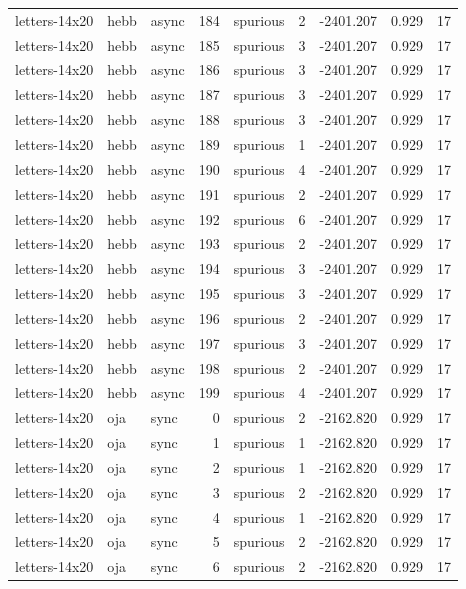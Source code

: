 \begin{tabular}{lllrlrrrr}
letters-14x20 & hebb & async & 184 & spurious & 2 & -2401.207 & 0.929 & 17 \\
letters-14x20 & hebb & async & 185 & spurious & 3 & -2401.207 & 0.929 & 17 \\
letters-14x20 & hebb & async & 186 & spurious & 3 & -2401.207 & 0.929 & 17 \\
letters-14x20 & hebb & async & 187 & spurious & 3 & -2401.207 & 0.929 & 17 \\
letters-14x20 & hebb & async & 188 & spurious & 3 & -2401.207 & 0.929 & 17 \\
letters-14x20 & hebb & async & 189 & spurious & 1 & -2401.207 & 0.929 & 17 \\
letters-14x20 & hebb & async & 190 & spurious & 4 & -2401.207 & 0.929 & 17 \\
letters-14x20 & hebb & async & 191 & spurious & 2 & -2401.207 & 0.929 & 17 \\
letters-14x20 & hebb & async & 192 & spurious & 6 & -2401.207 & 0.929 & 17 \\
letters-14x20 & hebb & async & 193 & spurious & 2 & -2401.207 & 0.929 & 17 \\
letters-14x20 & hebb & async & 194 & spurious & 3 & -2401.207 & 0.929 & 17 \\
letters-14x20 & hebb & async & 195 & spurious & 3 & -2401.207 & 0.929 & 17 \\
letters-14x20 & hebb & async & 196 & spurious & 2 & -2401.207 & 0.929 & 17 \\
letters-14x20 & hebb & async & 197 & spurious & 3 & -2401.207 & 0.929 & 17 \\
letters-14x20 & hebb & async & 198 & spurious & 2 & -2401.207 & 0.929 & 17 \\
letters-14x20 & hebb & async & 199 & spurious & 4 & -2401.207 & 0.929 & 17 \\
letters-14x20 & oja & sync & 0 & spurious & 2 & -2162.820 & 0.929 & 17 \\
letters-14x20 & oja & sync & 1 & spurious & 1 & -2162.820 & 0.929 & 17 \\
letters-14x20 & oja & sync & 2 & spurious & 1 & -2162.820 & 0.929 & 17 \\
letters-14x20 & oja & sync & 3 & spurious & 2 & -2162.820 & 0.929 & 17 \\
letters-14x20 & oja & sync & 4 & spurious & 1 & -2162.820 & 0.929 & 17 \\
letters-14x20 & oja & sync & 5 & spurious & 2 & -2162.820 & 0.929 & 17 \\
letters-14x20 & oja & sync & 6 & spurious & 2 & -2162.820 & 0.929 & 17 \\

\end{tabular}
